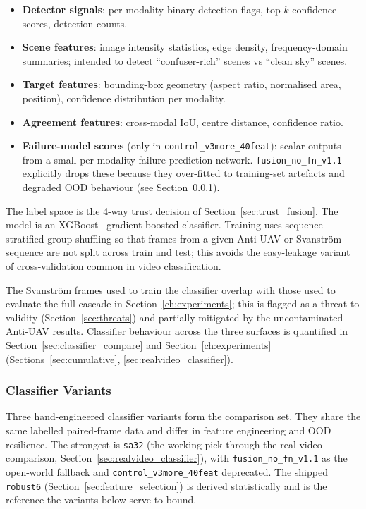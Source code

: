 \begin{itemize}
    \item \textbf{Detector signals}: per-modality binary detection flags, top-$k$ confidence scores, detection counts.
    \item \textbf{Scene features}: image intensity statistics, edge density, frequency-domain summaries; intended to detect ``confuser-rich'' scenes vs ``clean sky'' scenes.
    \item \textbf{Target features}: bounding-box geometry (aspect ratio, normalised area, position), confidence distribution per modality.
    \item \textbf{Agreement features}: cross-modal IoU, centre distance, confidence ratio.
    \item \textbf{Failure-model scores} (only in \texttt{control\_v3more\_40feat}): scalar outputs from a small per-modality failure-prediction network. \texttt{fusion\_no\_fn\_v1.1} explicitly drops these because they over-fitted to training-set artefacts and degraded OOD behaviour (see Section~\ref{sec:classifier_variants}).
\end{itemize}

The label space is the 4-way trust decision of Section~\ref{sec:trust_fusion}. The model is an XGBoost~\cite{chen2016xgboost} gradient-boosted classifier. Training uses sequence-stratified group shuffling so that frames from a given Anti-UAV or Svanstr\"om sequence are not split across train and test; this avoids the easy-leakage variant of cross-validation common in video classification.

The Svanstr\"om frames used to train the classifier overlap with those used to evaluate the full cascade in Section~\ref{ch:experiments}; this is flagged as a threat to validity (Section~\ref{sec:threats}) and partially mitigated by the uncontaminated Anti-UAV results. Classifier behaviour across the three surfaces is quantified in Section~\ref{sec:classifier_compare} and Section~\ref{ch:experiments} (Sections~\ref{sec:cumulative}, \ref{sec:realvideo_classifier}).

\subsubsection{Classifier Variants}
\label{sec:classifier_variants}

Three hand-engineered classifier variants form the comparison set. They share the same labelled paired-frame data and differ in feature engineering and OOD resilience. The strongest is \texttt{sa32} (the working pick through the real-video comparison, Section~\ref{sec:realvideo_classifier}), with \texttt{fusion\_no\_fn\_v1.1} as the open-world fallback and \texttt{control\_v3more\_40feat} deprecated. The shipped \texttt{robust6} (Section~\ref{sec:feature_selection}) is derived statistically and is the reference the variants below serve to bound.

